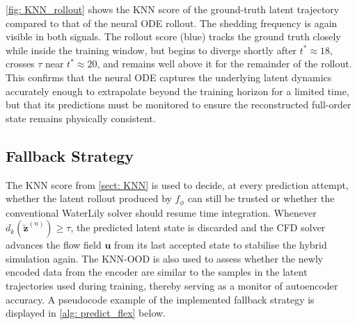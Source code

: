 \autoref{fig: KNN_rollout} shows the KNN score of the ground-truth latent trajectory compared to that of the neural ODE rollout. The shedding frequency is again visible in both signals. The rollout score (blue) tracks the ground truth closely while inside the training window, but begins to diverge shortly after $t^* \approx 18$, crosses $\tau$ near $t^* \approx 20$, and remains well above it for the remainder of the rollout. This confirms that the neural ODE captures the underlying latent dynamics accurately enough to extrapolate beyond the training horizon for a limited time, but that its predictions must be monitored to ensure the reconstructed full-order state remains physically consistent.


\subsection{Fallback Strategy}
\label{sect: fallback}

The KNN score from \autoref{sect: KNN} is used to decide, at every prediction attempt, whether the latent rollout produced by $f_\phi$ can still be trusted or whether the conventional WaterLily solver should resume time integration. Whenever $d_k(\tilde{\mathbf{z}}^{(n)}) \geq \tau$, the predicted latent state is discarded and the CFD solver advances the flow field $\mathbf{u}$ from its last accepted state to stabilise the hybrid simulation again. The KNN-OOD is also used to assess whether the newly encoded data from the encoder are similar to the samples in the latent trajectories used during training, thereby serving as a monitor of autoencoder accuracy. A pseudocode example of the implemented fallback strategy is displayed in \autoref{alg: predict_flex} below. 

